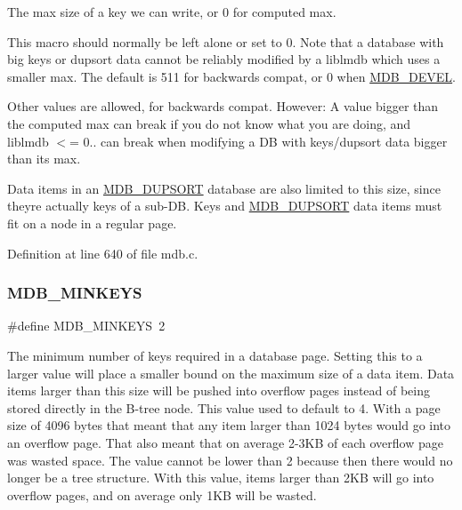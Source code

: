 The max size of a key we can write, or 0 for computed max. 

This macro should normally be left alone or set to 0. Note that a database with big keys or dupsort data cannot be reliably modified by a liblmdb which uses a smaller max. The default is 511 for backwards compat, or 0 when \mbox{\hyperlink{group__compat_ga103b045068a1d21bf2347a7342f8f486}{M\+D\+B\+\_\+\+D\+E\+V\+EL}}.

Other values are allowed, for backwards compat. However\+: A value bigger than the computed max can break if you do not know what you are doing, and liblmdb $<$= 0.. can break when modifying a DB with keys/dupsort data bigger than its max.

Data items in an \mbox{\hyperlink{group__mdb__dbi__open_gae0626566c2562e9007f5c8c9535bab1a}{M\+D\+B\+\_\+\+D\+U\+P\+S\+O\+RT}} database are also limited to this size, since they\textquotesingle{}re actually keys of a sub-\/\+DB. Keys and \mbox{\hyperlink{group__mdb__dbi__open_gae0626566c2562e9007f5c8c9535bab1a}{M\+D\+B\+\_\+\+D\+U\+P\+S\+O\+RT}} data items must fit on a node in a regular page. 

Definition at line 640 of file mdb.\+c.

\mbox{\label{group__internal_ga8384281689ac8f7b6ffc9c727025dbf0}} 
\subsubsection{\texorpdfstring{M\+D\+B\+\_\+\+M\+I\+N\+K\+E\+YS}{MDB\_MINKEYS}}
{\footnotesize\ttfamily \#define M\+D\+B\+\_\+\+M\+I\+N\+K\+E\+YS~2}

The minimum number of keys required in a database page. Setting this to a larger value will place a smaller bound on the maximum size of a data item. Data items larger than this size will be pushed into overflow pages instead of being stored directly in the B-\/tree node. This value used to default to 4. With a page size of 4096 bytes that meant that any item larger than 1024 bytes would go into an overflow page. That also meant that on average 2-\/3\+KB of each overflow page was wasted space. The value cannot be lower than 2 because then there would no longer be a tree structure. With this value, items larger than 2\+KB will go into overflow pages, and on average only 1\+KB will be wasted. 

